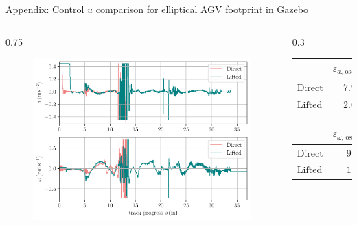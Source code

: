 \documentclass[10pt,aspectratio=1610]{beamer} %
\begin{document}
\begin{frame}{Appendix: Control $u$ comparison for elliptical AGV footprint in Gazebo}
	\begin{columns}
	\begin{column}{0.75\textwidth}
	\begin{figure}[h!tbp]
		\includegraphics[scale=0.65]{figures/u_2c}
	\end{figure}
	\end{column}
	\begin{column}{0.3\textwidth}
		\begin{table}[h!tbp]
			\small
			\begin{center}
				\begin{tabular}{lccccl}\toprule
					& $\varepsilon_{a,\,\mathrm{osc}}\,(\mathrm{m\,s^{-2}})$\\
					\midrule
					$\mathrm{Direct}$& $7.95\cdot10^{-1}$\\
					$\mathrm{Lifted}$& $2.67\cdot10^{-1}$\\
					\bottomrule
				\end{tabular}
			\end{center}
		\end{table}

		\begin{table}[h!tbp]
			\small
			\begin{center}
				\begin{tabular}{lccccl}\toprule
					& $\varepsilon_{\omega,\,\mathrm{osc}}\,(\mathrm{rad\,s^{-1}})$\\
					\midrule
					$\mathrm{Direct}$& $9.90\cdot10^{-2}$\\
					$\mathrm{Lifted}$& $1.78\cdot10^{-2}$\\
					\bottomrule
				\end{tabular}
			\end{center}
		\end{table}
	\end{column}
\end{columns}
\end{frame}
\end{document}
